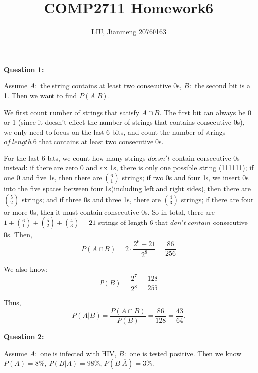 \documentclass[a4paper,11pt]{article}
\title{\textbf{COMP2711} Homework6}
\author{LIU, Jianmeng 20760163}
\date{}
\begin{document}
    \maketitle

    \begin{spacing}{1.4}

    \setlength{\parindent}{0em}

    \textbf{Question 1:}

    \hspace{2em}
    Assume $A:$ the string contains at least two consecutive 0s, 
    $B:$ the second bit is a 1. Then we want to find $P(A|B).$

    \hspace{2em}
    We first count number of strings that satisfy $A\cap B$.
    The first bit can always be 0 or 1 (since it doesn't effect
    the number of strings that contains consecutive 0s), we only
    need to focus on the last 6 bits, and count the number of strings
    $of\ length\ 6$ that contains at least two consecutive 0s.

    \hspace{2em}
    For the last 6 bits, we count how many strings $doesn't$ contain
    consecutive 0s instead:
    if there are zero 0 and six 1s, 
    there is only one possible string (111111); if one 0 and 
    five 1s, then there are ${6\choose 1}$ strings; 
    if two 0s and four 1s, we insert 0s into the five spaces between
    four 1s(including left and right sides), then there are 
    ${5\choose 2}$ strings; and if three 0s and three 1s,
    there are ${4\choose 3}$ strings; if there are four or more 0s,
    then it must contain consecutive 0s. So in total, there are
    $1+{6\choose 1}+{5\choose 2}+{4\choose 3}=21$ strings of length 6
    that $don't\ contain$ consecutive 0s. Then,
    $$P(A\cap B)=2\cdot \frac{2^6-21}{2^8}=\frac{86}{256}$$
    
    We also know:
    $$P(B)=\frac{2^7}{2^8}=\frac{128}{256}$$

    Thus,
    $$P(A|B)=\frac{P(A\cap B)}{P(B)}=\frac{86}{128}=\frac{43}{64}.$$


    \textbf{Question 2:}

    \hspace{2em}
    Assume $A:$ one is infected with HIV, $B:$ one is tested positive.
    Then we know $P(A)=8\%,\ P(B|A)=98\%,\ P(B|\overline{A})=3\%$.


\end{spacing}
\end{document}
